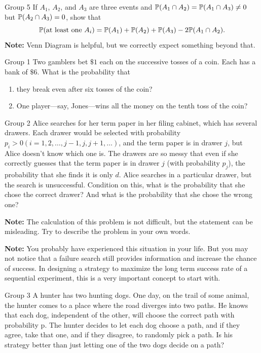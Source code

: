 \documentclass{article}
\begin{document}
\begin{problem}
    {Group 5}
    If $A_1$, $A_2$, and $A_3$ are three events and $\P{A_1\cap A_2}=\P{A_1\cap A_3}\neq0$ but $\P{A_2\cap A_3}=0$, show that
    \[\P{\text{at least one}\ A_i}=\P{A_1}+\P{A_2}+\P{A_3}-2\P{A_1\cap A_2}.\]
    \textbf{Note:} Venn Diagram is helpful, but we correctly expect something beyond that.
\end{problem}
\begin{problem}
    {Group 1}
    Two gamblers bet $\$1$ each on the successive tosses of a coin. Each has a bank of $\$6$. What is the probability that
    \begin{enumerate}
        \item they break even after six tosses of the coin?
        \item One player—say, Jones—wins all the money on the tenth toss of the coin?
    \end{enumerate}
\end{problem}

\begin{problem}
    {Group 2}
    Alice searches for her term paper in her filing cabinet, which has several drawers. Each drawer would be selected with probability $p_i>0 (i=1,2,\ldots,j-1,j,j+1,\ldots)$, and the term paper is in drawer $j$, but Alice doesn't know which one is. The drawers are so messy that even if she correctly guesses that the term paper is in drawer $j$ (\ie with probability $p_j$), the probability that she finds it is only $d$. Alice searches in a particular drawer, but the search is unsuccessful. Condition on this, what is the probability that she chose the correct drawer? And what is the probability that she chose the wrong one?

    \textbf{Note:} The calculation of this problem is not difficult, but the statement can be misleading. Try to describe the problem in your own words.

    \textbf{Note:} You probably have experienced this situation in your life. But you may not notice that a failure search still provides information and increase the chance of success. In designing a strategy to maximize the long term success rate of a sequential experiment, this is a very important concept to start with.
\end{problem}

\begin{problem}
    {Group 3}
    A hunter has two hunting dogs. One day, on the trail of some animal, the hunter comes to a place where the road diverges into two paths. He knows that each dog, independent of the other, will choose the correct path with probability p. The hunter decides to let each dog choose a path, and if they agree, take that one, and if they disagree, to randomly pick a path. Is his strategy better than just letting one of the two dogs decide on a path?
\end{problem}
\end{document}
